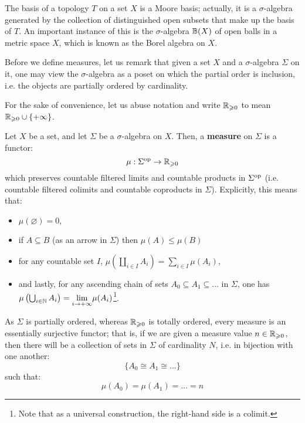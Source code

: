         \begin{example}
            The basis of a topology $T$ on a set $X$ is a Moore basis; actually, it is a $\sigma$-algebra generated by the collection of distinguished open subsets that make up the basis of $T$. An important instance of this is the $\sigma$-algebra $\mathbb{B}(X)$ of open balls in a metric space $X$, which is known as the Borel algebra on $X$.
        \end{example}
        
        \begin{remark}
            Before we define measures, let us remark that given a set $X$ and a $\sigma$-algebra $\Sigma$ on it, one may view the $\sigma$-algebra as a poset on which the partial order is inclusion, i.e. the objects are partially ordered by cardinality.
        \end{remark}
        \begin{convention}
            For the sake of convenience, let us abuse notation and write $\mathbb{R}_{\geqslant 0}$ to mean $\mathbb{R}_{\geqslant 0} \cup \{+\infty\}$.
        \end{convention}
        \begin{definition}[Measures] \label{def: measures}
            Let $X$ be a set, and let $\Sigma$ be a $\sigma$-algebra on $X$. Then, a \textbf{measure} on $\Sigma$ is a functor:
                $$\mu: \Sigma^{\mathrm{op}} \to \mathbb{R}_{\geqslant 0}$$
            which preserves countable filtered limits and countable products in $\Sigma^{\mathrm{op}}$ (i.e. countable filtered colimits and countable coproducts in $\Sigma$). Explicitly, this means that:
                \begin{itemize}
                    \item $\mu(\varnothing) = 0$,
                    \item if $A \subseteq B$ (as an arrow in $\Sigma$) then $\mu(A) \leq \mu(B)$
                    \item for any countable set $I$, $\mu\left(\coprod_{i \in I} A_i\right) = \sum_{i \in I} \mu(A_i)$, 
                    \item and lastly, for any ascending chain of sets $A_0 \subseteq A_1 \subseteq ...$ in $\Sigma$, one has $\mu\left(\bigcup_{i \in \mathbb{N}} A_i\right) = \underset{i \to +\infty}{\operatorname{lim}} \mu(A_i)$\footnote{Note that as a universal construction, the right-hand side is a colimit.}.
                \end{itemize}
        \end{definition}
        \begin{remark}
            As $\Sigma$ is partially ordered, whereas $\mathbb{R}_{\geqslant 0}$ is totally ordered, every measure is an essentially surjective functor; that is, if we are given a measure value $n \in \mathbb{R}_{\geqslant 0}$, then there will be a collection of sets in $\Sigma$ of cardinality $N$, i.e. in bijection with one another:
                $$\{A_0 \cong A_1 \cong ...\}$$
            such that:
                $$\mu(A_0) = \mu(A_1) = ... = n$$
        \end{remark}
